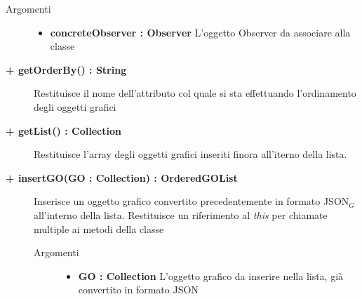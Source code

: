 \begin{description}
\begin{description}
		\begin{description}
			\item[Argomenti] \hfill
				\begin{itemize}
				
					\item \textbf{concreteObserver : Observer			} \hfill
					L'oggetto Observer da associare alla classe
					
				\end{itemize}
		\end{description}
	\end{description}
	
	\begin{description}
		\item[\textbf{\color{blue}+ getOrderBy() : String			}] \hfill
			Restituisce il nome dell'attributo col quale si sta effettuando l'ordinamento degli oggetti grafici

	\end{description}
	
	\begin{description}
		\item[\textbf{\color{blue}+ getList() : Collection			}] \hfill
			Restituisce l'array degli oggetti grafici inseriti finora all'iterno della lista.

	\end{description}
	
	\begin{description}
		\item[\textbf{\color{blue}+ insertGO(GO : Collection) : OrderedGOList			}] \hfill
			Inserisce un oggetto grafico convertito precedentemente in formato JSON$_G$ all'interno della lista. Restituisce un riferimento al \textit{this} per chiamate multiple ai metodi della classe
			
		\begin{description}
			\item[Argomenti] \hfill
				\begin{itemize}
				
					\item \textbf{GO : Collection			} \hfill
					L'oggetto grafico da inserire nella lista, già convertito in formato JSON
					
				\end{itemize}
		\end{description}
	\end{description}
	

\end{description}
